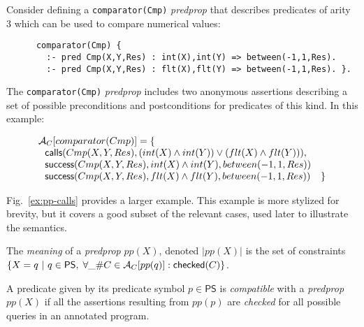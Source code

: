 \documentclass{llncs}
\newcommand{\PS}{\textsf{PS}}
\newcommand{\AC}
  {\ensuremath{{\cal A}_{C}}}
\newcommand{\ACpp}[1]
  {\ensuremath{\AC[#1]}}
\newcommand{\kbd}[1]{\mbox{\tt #1}}
\newcommand{\skbd}[1]{\mbox{\tt\small{#1}}}
\newcommand{\checkedAsr}[1]{\ensuremath{\textsf{checked}(#1)}}
\newcommand{\callsAsr}[2]{\ensuremath{\textsf{calls}(#1, #2)}}
\newcommand{\successAsr}[3]{\ensuremath{\textsf{success}(#1, #2, #3)}}
\begin{document}
\begin{example}
  Consider defining a \skbd{comparator(Cmp)} \emph{predprop} that
  describes predicates of arity 3 which can be used to compare
  numerical values:
  \begin{small}
    \begin{verbatim}
      comparator(Cmp) {
        :- pred Cmp(X,Y,Res) : int(X),int(Y) => between(-1,1,Res).
        :- pred Cmp(X,Y,Res) : flt(X),flt(Y) => between(-1,1,Res). }.
    \end{verbatim}
  \end{small}
The \kbd{comparator(Cmp)} \emph{predprop} includes two anonymous
  assertions describing a set of possible preconditions and
  postconditions for predicates of this kind. In this example:
  \begin{small}
    \[
    \begin{array}{ll}
      \ACpp{comparator(Cmp)} = \{ 
    & \\
    ~~\callsAsr{Cmp(X,Y,Res)}{(int(X) \wedge int(Y)) \vee 
                                           (flt(X) \wedge flt(Y))},
    & \\
    ~~\successAsr{Cmp(X,Y,Res)}{int(X) \wedge int(Y)}{between(-1,1,Res)}
    & \\
    ~~\successAsr{Cmp(X,Y,Res)}{flt(X) \wedge flt(Y)}{between(-1,1,Res)} 
    & 
      \}
    \end{array}
    \]
  \end{small}
\end{example}

\begin{example}
  Fig.~\ref{ex:pp-calls} provides a larger example. This example
  is more stylized for brevity, but it covers a good subset of the
  relevant cases, 
  used later to illustrate the semantics.
\end{example}

\begin{definition}
  \label{def:pp-meaning}
  The \emph{meaning} of a \emph{predprop} $pp(X)$, denoted $|pp(X)|$
  is the set of constraints 
  $\{ X = q ~|~ q \in \PS,\; \forall \_\#C \in \ACpp{pp(q)}:
    \checkedAsr{C} \}$.
\end{definition}

A predicate given by its predicate symbol $p \in \PS$ is
\emph{compatible}
with a \emph{predprop} $pp(X)$ if all the assertions resulting from
$pp(p)$ are \emph{checked} for all possible queries in an annotated
program.
\end{document}
